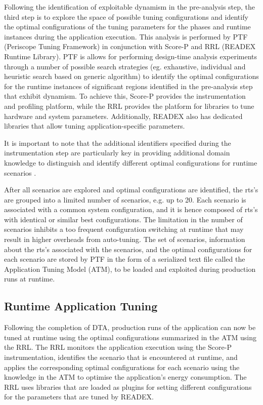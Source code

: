 Following the identification of exploitable dynamism in the pre-analysis step, the third step is to explore the space of possible tuning configurations and identify the optimal configurations of the tuning parameters for the phases and runtime instances during the application execution. This analysis is performed by PTF (Periscope Tuning Framework) in conjunction with Score-P and RRL (READEX Runtime Library). PTF is allows for performing design-time analysis experiments through a number of possible search strategies (eg. exhaustive, individual and heuristic search based on generic algorithm) to identify the optimal configurations for the runtime instances of significant regions identified in the pre-analysis step that exhibit dynamism. To achieve this, Score-P provides the instrumentation and profiling platform, while the RRL provides the platform for libraries to tune hardware and system parameters. Additionally, READEX also has dedicated libraries that allow tuning application-specific parameters.

It is important to note that the additional identifiers specified during the instrumentation step are particularly key in providing additional domain knowledge to distinguish and identify different optimal configurations for runtime scenarios \cite{PACO17}.

After all scenarios are explored and optimal configurations are identified, the rts's are grouped into a limited number of scenarios, e.g. up to 20. Each scenario is associated with a common system configuration, and it is hence composed of rts's with identical or similar best configurations. The limitation in the number of scenarios inhibits a too frequent configuration switching at runtime that may result in higher overheads from auto-tuning. The set of scenarios, information about the rts's associated with the scenarios, and the optimal configurations for each scenario are stored by PTF in the form of a serialized text file called the Application Tuning Model (ATM), to be loaded and exploited during production runs at runtime.

\subsection{Runtime Application Tuning}
\label{sec:runtime_tuning}

Following the completion of DTA, production runs of the application can now be tuned at runtime using the optimal configurations summarized in the ATM using the RRL. The RRL monitors the application execution using the Score-P instrumentation, identifies the scenario that is encountered at runtime, and applies the corresponding optimal configurations for each scenario using the knowledge in the ATM to optimise the application's energy consumption. The RRL uses libraries that are loaded as plugins for setting different configurations for the parameters that are tuned by READEX.


